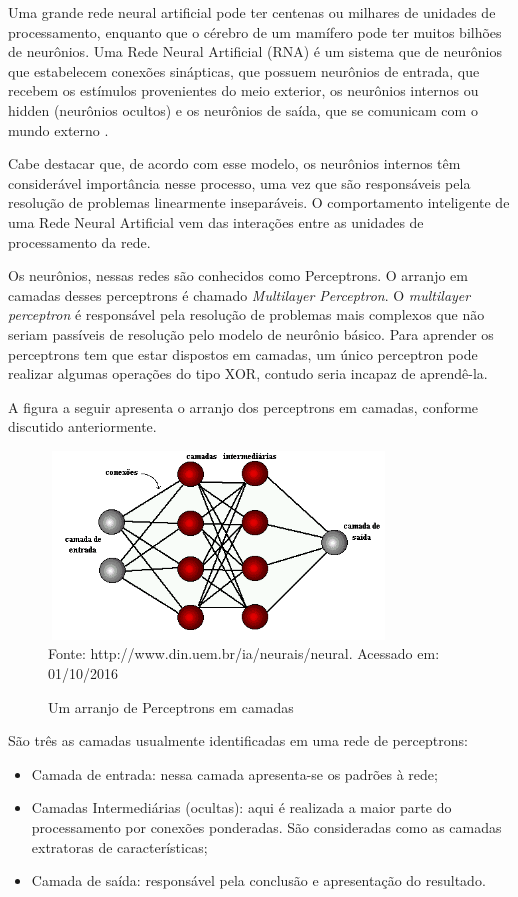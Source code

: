 Uma grande rede neural artificial pode ter centenas ou milhares de unidades de processamento, enquanto que o cérebro de um mamífero pode ter muitos bilhões de neurônios. 
Uma Rede Neural Artificial (RNA) é um sistema que de neurônios que estabelecem conexões sinápticas, que possuem neurônios de entrada, que recebem os estímulos provenientes 
do meio exterior, os neurônios internos ou hidden (neurônios ocultos) e os neurônios de saída, que se comunicam com o mundo externo \cite{Tatibana}.

Cabe destacar que, de acordo com esse modelo, os neurônios internos têm considerável importância nesse processo, uma vez que são responsáveis pela resolução de problemas linearmente inseparáveis. 
O comportamento inteligente de uma Rede Neural Artificial vem das interações entre as unidades de processamento da rede.

Os neurônios, nessas redes são conhecidos como Perceptrons. O arranjo em camadas desses perceptrons é chamado \textit{Multilayer Perceptron}.
O \textit{multilayer perceptron} é responsável pela resolução de problemas mais complexos que não seriam passíveis de resolução pelo modelo 
de neurônio básico. Para aprender os perceptrons tem que estar dispostos em camadas, um único perceptron pode realizar algumas operações do 
tipo XOR, contudo seria incapaz de aprendê-la.

A figura a seguir apresenta o arranjo dos perceptrons em camadas, conforme discutido anteriormente.
\pagebreak

\begin{figure}[!ht]
\centering
\caption{Um arranjo de Perceptrons em camadas}
\vspace{1mm}
\includegraphics[width=90mm, height=50mm]{Figuras/Neural/camdasIntermediarias.png}\\
\tiny Fonte: http://www.din.uem.br/ia/neurais/neural. Acessado em: 01/10/2016
\end{figure}

São três as camadas usualmente identificadas em uma rede de perceptrons:
\begin{itemize}
 \item Camada de entrada: nessa camada apresenta-se os padrões à rede;
 \item Camadas Intermediárias (ocultas): aqui é realizada a maior parte do processamento por conexões ponderadas. São consideradas como as camadas 
 extratoras de características;
 \item Camada de saída: responsável pela conclusão e apresentação do resultado.
\end{itemize}

